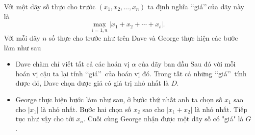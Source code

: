\begin{vd}%
	Với một dãy số thực cho trước $(x_1,x_2,\ldots,x_n)$ ta định nghĩa \lq\lq giá\rq\rq \,của dãy này là 
	$$\displaystyle \max _{i=\overline{1,n}}|x_1+x_2+\cdots+x_i|.$$
	Với mỗi dãy $n$ số thực cho trước như trên Dave và George thực hiện các bước làm như sau
	\begin{itemize}
		\item Dave chăm chỉ viết tất cả các hoán vị $\alpha
		$ của dãy ban đầu Sau đó với mỗi hoán vị cậu ta lại tính \lq\lq giá\rq\rq \, của hoán vị đó. Trong tất cả những \lq\lq giá\rq\rq\, tính được đó, Dave chọn được giá có giá trị nhỏ nhất là $D$.
		\item George thực hiện bước làm như sau, ở bước thứ nhất anh ta chọn số $x_1$ sao cho $|x_1|$ là nhỏ nhất. Bước hai chọn số $x_2$ sao cho $|x_1 + x_2|$ là nhỏ nhất. Tiếp tục như vậy cho tới $x_n$. Cuối cùng George nhận được một dãy số có "giá" là $G$.
	\end{itemize}
	

\end{vd}
